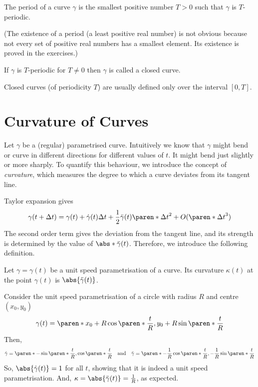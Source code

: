 \documentclass[11pt]{penrose}
\begin{document}
\begin{ndfn}
    The period of a curve $\gamma$ is the smallest positive number $T > 0$ such that $\gamma$ is $T$-periodic.
\end{ndfn}

(The existence of a period (a least positive real number) is not obvious because not every set of positive real numbers has a smallest element. Its existence is proved in the exercises.)

\begin{ndfn}
    If $\gamma$ is $T$-periodic for $T \neq 0$ then $\gamma$ is called a closed curve.
\end{ndfn}

Closed curves (of periodicity $T$) are usually defined only over the interval $[0, T]$.

\section{Curvature of Curves}
Let $\gamma$ be a (regular) parametrised curve. Intuitively we know that $\gamma$ might bend or curve in different directions for different values of $t$. It might bend just slightly or more sharply. To quantify this behaviour, we introduce the concept of \emph{curvature}, which measures the degree to which a curve deviates from its tangent line.

Taylor expansion gives
\begin{equation}
    \gamma(t + \Delta t)
    = \gamma(t) + \dot{\gamma}(t) \Delta t + \frac{1}{2} \ddot{\gamma}(t) \paren*{\Delta t}^2
    + O(\paren*{\Delta t}^3)
\end{equation}
The second order term gives the deviation from the tangent line, and its strength is determined by the value of $\abs*{\ddot{\gamma}(t)}$. Therefore, we introduce the following definition.

\begin{ndfn}
    Let $\gamma = \gamma(t)$ be a unit speed parametrisation of a curve. Its curvature $\kappa(t)$ at the point $\gamma(t)$ is $\abs{\ddot{\gamma}(t)}$.
\end{ndfn}

\begin{egg}
    Consider the unit speed parametrisation of a circle with radius $R$ and centre $(x_0, y_0)$
    \begin{equation}
        \gamma(t) = \paren*{ x_0 + R \cos\paren*{ \frac{t}{R} }, y_0 + R \sin\paren*{ \frac{t}{R} } }
    \end{equation}
    Then,
    \begin{equation}
        \dot{\gamma} = \paren*{ -\sin\paren*{ \frac{t}{R} }, \cos\paren*{ \frac{t}{R} } }
        \quad\text{and}\quad
        \ddot{\gamma} = \paren*{ -\frac{1}{R} \cos\paren*{ \frac{t}{R} }, -\frac{1}{R} \sin\paren*{ \frac{t}{R} } }
    \end{equation}
    So, $\abs{\dot{\gamma}(t)} = 1$ for all $t$, showing that it is indeed a unit speed parametrisation. And, $\kappa = \abs{\ddot{\gamma}(t)} = \frac{1}{R}$, as expected.
\end{egg}
\end{document}
